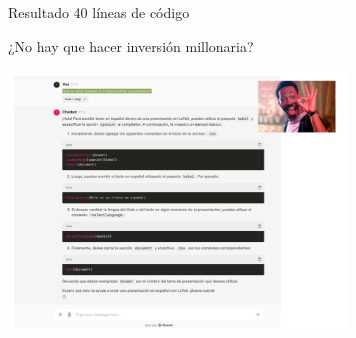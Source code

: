\documentclass[table, unknownkeysallowed, 10pt]{beamer}
\begin{document}
\begin{frame}{Resultado 40 líneas de código}
    \begin{block}{¿No hay que hacer inversión millonaria?}
    \begin{center}
        \includegraphics[width=9cm]{imagenes/chainlit.png}
    \end{center}
\end{block}

\end{frame}
\end{document}

